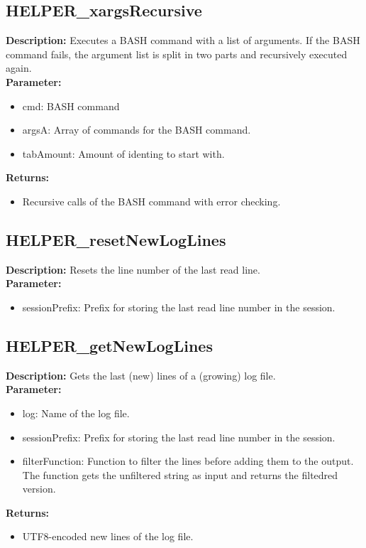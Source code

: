 \subsection{HELPER\_xargsRecursive}
\textbf{Description:} Executes a BASH command with a list of arguments. If the BASH command fails, the argument list is split in two parts and recursively executed again.\\
\textbf{Parameter:}
\begin{itemize}
\item cmd: BASH command
\item argsA: Array of commands for the BASH command.
\item tabAmount: Amount of identing to start with.
\end{itemize}
\textbf{Returns:}
\begin{itemize}
\item Recursive calls of the BASH command with error checking.
\end{itemize}

\subsection{HELPER\_resetNewLogLines}
\textbf{Description:} Resets the line number of the last read line.\\
\textbf{Parameter:}
\begin{itemize}
\item sessionPrefix: Prefix for storing the last read line number in the session.
\end{itemize}

\subsection{HELPER\_getNewLogLines}
\textbf{Description:} Gets the last (new) lines of a (growing) log file.\\
\textbf{Parameter:}
\begin{itemize}
\item log: Name of the log file.
\item sessionPrefix: Prefix for storing the last read line number in the session.
\item filterFunction: Function to filter the lines before adding them to the output. The function gets the unfiltered string as input and returns the filtedred version.
\end{itemize}
\textbf{Returns:}
\begin{itemize}
\item UTF8-encoded new lines of the log file.
\end{itemize}

